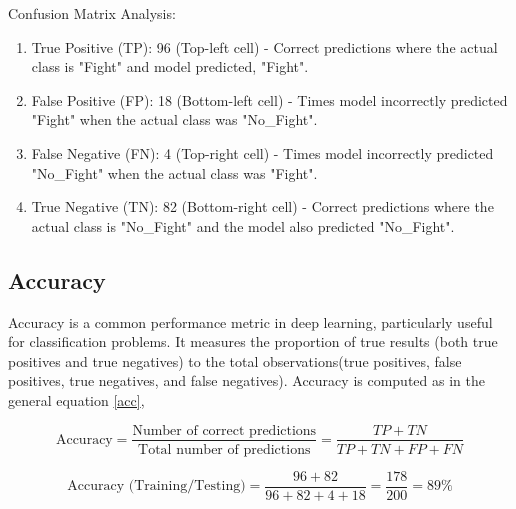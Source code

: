\noindent Confusion Matrix Analysis:

\begin{enumerate}
    \item True Positive (TP): 96 (Top-left cell) - Correct predictions where the actual class is "Fight" and model predicted, "Fight".

    \item False Positive (FP): 18 (Bottom-left cell) - Times model incorrectly predicted "Fight" when the actual class was "No\_Fight".

    \item False Negative (FN): 4 (Top-right cell) - Times model incorrectly predicted "No\_Fight" when the actual class was "Fight".

    \item True Negative (TN): 82 (Bottom-right cell) - Correct predictions where the actual class is "No\_Fight" and the model also predicted "No\_Fight".
    
\end{enumerate}

\clearpage

\subsection{Accuracy}

\noindent Accuracy is a common performance metric in deep learning, particularly useful for classification problems. It measures the proportion of true results (both true positives and true negatives) to the total observations(true positives, false positives, true negatives, and false negatives). Accuracy is computed as in the general equation \ref{acc},

\begin{equation}
\text{Accuracy} = \frac{\text{Number of correct predictions}}{\text{Total number of predictions}} = \frac{TP + TN}{TP + TN + FP + FN}
\label{acc}
\end{equation}

\[
\text{Accuracy (Training/Testing)} = \frac{96 + 82}{96 + 82 + 4 + 18} = \frac{178}{200} = 89\%
\]


